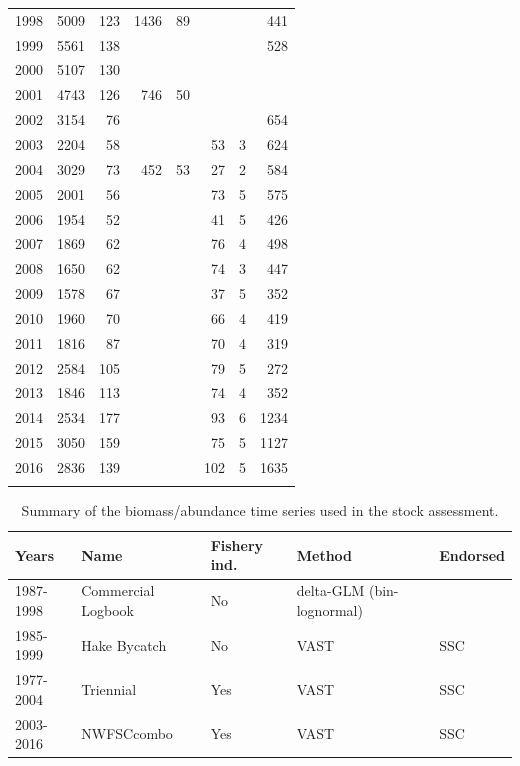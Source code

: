 \documentclass[12pt,]{article}
\begin{document}
\begin{longtable}{rrrrrrrr}
  1998 & 5009 &  123 & 1436 &   89 &  &  &  441 \\ 
  1999 & 5561 &  138 &  &  &  &  &  528 \\ 
  2000 & 5107 &  130 &  &  &  &  &  \\ 
  2001 & 4743 &  126 &  746 &   50 &  &  &  \\ 
  2002 & 3154 &   76 &  &  &  &  &  654 \\ 
  2003 & 2204 &   58 &  &  &   53 &    3 &  624 \\ 
  2004 & 3029 &   73 &  452 &   53 &   27 &    2 &  584 \\ 
  2005 & 2001 &   56 &  &  &   73 &    5 &  575 \\ 
  2006 & 1954 &   52 &  &  &   41 &    5 &  426 \\ 
  2007 & 1869 &   62 &  &  &   76 &    4 &  498 \\ 
  2008 & 1650 &   62 &  &  &   74 &    3 &  447 \\ 
  2009 & 1578 &   67 &  &  &   37 &    5 &  352 \\ 
  2010 & 1960 &   70 &  &  &   66 &    4 &  419 \\ 
  2011 & 1816 &   87 &  &  &   70 &    4 &  319 \\ 
  2012 & 2584 &  105 &  &  &   79 &    5 &  272 \\ 
  2013 & 1846 &  113 &  &  &   74 &    4 &  352 \\ 
  2014 & 2534 &  177 &  &  &   93 &    6 & 1234 \\ 
  2015 & 3050 &  159 &  &  &   75 &    5 & 1127 \\ 
  2016 & 2836 &  139 &  &  &  102 &    5 & 1635 \\ 
   \hline
\hline
\label{tab:Northern_age}
\end{longtable}

\newpage

\begin{table}[ht]
\centering
\caption{Summary of the biomass/abundance
                                              time series used in the stock
                                              assessment.} 
\label{tab:Index_summary}
\begin{tabular}{lllll}
  \hline
Years & Name & Fishery ind. & Method & Endorsed \\ 
  \hline
1987-1998 & Commercial Logbook & No & delta-GLM (bin-lognormal) &  \\ 
  1985-1999 & Hake Bycatch & No & VAST & SSC \\ 
  1977-2004 & Triennial & Yes & VAST & SSC \\ 
  2003-2016 & NWFSCcombo & Yes & VAST & SSC \\ 
   \hline
\end{tabular}
\end{table}
\end{document}
